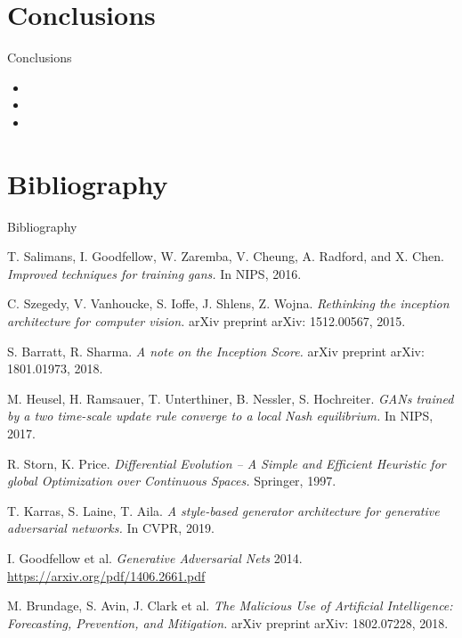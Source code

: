\documentclass[t]{beamer}
\begin{document}
\section{Conclusions}

\begin{frame}[c]{Conclusions}
\begin{itemize}
\item 
\item 
\item 
\end{itemize}
\end{frame}

\section{Bibliography}

\begin{frame}{Bibliography}
\fontsize{2}{7.2}\selectfont
\begin{thebibliography}{a,b,c}
 T. Salimans, I. Goodfellow, W. Zaremba, V. Cheung, A. Radford, and X. Chen. {\it Improved techniques for training gans.} In NIPS, 2016.

 C. Szegedy, V. Vanhoucke, S. Ioffe, J. Shlens, Z. Wojna. {\it Rethinking the inception architecture for computer vision.} arXiv preprint arXiv: 1512.00567, 2015.

 S. Barratt, R. Sharma. {\it A note on the Inception Score.} arXiv preprint arXiv: 1801.01973, 2018.

 M. Heusel, H. Ramsauer, T. Unterthiner, B. Nessler, S. Hochreiter. {\it GANs trained by a two time-scale update rule converge to a local Nash equilibrium.} In NIPS, 2017.

 R. Storn, K. Price. {\it Differential Evolution – A Simple and Efficient Heuristic for global Optimization over Continuous Spaces.} Springer, 1997.

 T. Karras, S. Laine, T. Aila. {\it A style-based generator architecture for generative adversarial networks.} In CVPR, 2019.

 I. Goodfellow et al.  {\it Generative Adversarial Nets} 2014.  \url{https://arxiv.org/pdf/1406.2661.pdf}

 M. Brundage, S. Avin, J. Clark et al. {\it The Malicious Use of Artificial Intelligence: Forecasting, Prevention, and Mitigation.} arXiv preprint arXiv: 1802.07228, 2018.


\end{thebibliography}
\end{frame}
\end{document}
